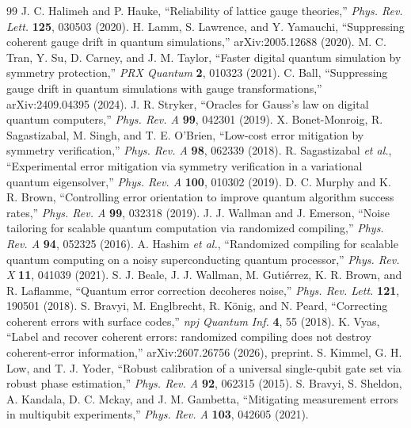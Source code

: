 \documentclass[11pt,a4paper]{article}
\begin{document}
\begin{thebibliography}{99}\small\itemsep0pt
 J. C. Halimeh and P. Hauke, ``Reliability of lattice gauge theories,'' \emph{Phys. Rev. Lett.} \textbf{125}, 030503 (2020).
 H. Lamm, S. Lawrence, and Y. Yamauchi, ``Suppressing coherent gauge drift in quantum simulations,'' arXiv:2005.12688 (2020).
 M. C. Tran, Y. Su, D. Carney, and J. M. Taylor, ``Faster digital quantum simulation by symmetry protection,'' \emph{PRX Quantum} \textbf{2}, 010323 (2021).
 C. Ball, ``Suppressing gauge drift in quantum simulations with gauge transformations,'' arXiv:2409.04395 (2024).
 J. R. Stryker, ``Oracles for Gauss's law on digital quantum computers,'' \emph{Phys. Rev. A} \textbf{99}, 042301 (2019).
 X. Bonet-Monroig, R. Sagastizabal, M. Singh, and T. E. O'Brien, ``Low-cost error mitigation by symmetry verification,'' \emph{Phys. Rev. A} \textbf{98}, 062339 (2018).
 R. Sagastizabal \emph{et al.}, ``Experimental error mitigation via symmetry verification in a variational quantum eigensolver,'' \emph{Phys. Rev. A} \textbf{100}, 010302 (2019).
 D. C. Murphy and K. R. Brown, ``Controlling error orientation to improve quantum algorithm success rates,'' \emph{Phys. Rev. A} \textbf{99}, 032318 (2019).
 J. J. Wallman and J. Emerson, ``Noise tailoring for scalable quantum computation via randomized compiling,'' \emph{Phys. Rev. A} \textbf{94}, 052325 (2016).
 A. Hashim \emph{et al.}, ``Randomized compiling for scalable quantum computing on a noisy superconducting quantum processor,'' \emph{Phys. Rev. X} \textbf{11}, 041039 (2021).
 S. J. Beale, J. J. Wallman, M. Guti\'errez, K. R. Brown, and R. Laflamme, ``Quantum error correction decoheres noise,'' \emph{Phys. Rev. Lett.} \textbf{121}, 190501 (2018).
 S. Bravyi, M. Englbrecht, R. K\"onig, and N. Peard, ``Correcting coherent errors with surface codes,'' \emph{npj Quantum Inf.} \textbf{4}, 55 (2018).
 K. Vyas, ``Label and recover coherent errors: randomized compiling does not destroy coherent-error information,'' arXiv:2607.26756 (2026), preprint.
 S. Kimmel, G. H. Low, and T. J. Yoder, ``Robust calibration of a universal single-qubit gate set via robust phase estimation,'' \emph{Phys. Rev. A} \textbf{92}, 062315 (2015).
 S. Bravyi, S. Sheldon, A. Kandala, D. C. Mckay, and J. M. Gambetta, ``Mitigating measurement errors in multiqubit experiments,'' \emph{Phys. Rev. A} \textbf{103}, 042605 (2021).

\end{thebibliography}
\end{document}

